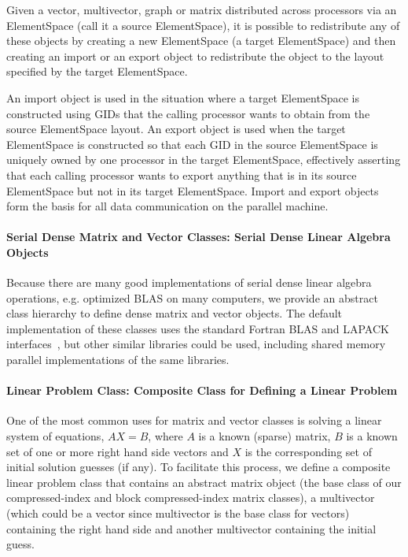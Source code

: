 \documentclass[10pt,relax]{PetraObjectModel}
\begin{document}
Given a vector, multivector, graph or matrix distributed across processors
via an ElementSpace (call it a source ElementSpace), it is possible to
redistribute any of these
objects by creating a new ElementSpace (a target ElementSpace) and then
creating an import or
an export object to redistribute the object to the layout specified by the
target ElementSpace.

An import object is used in the situation where a target ElementSpace is
 constructed
using GIDs that the calling processor wants to obtain from the source
 ElementSpace
layout.  An export object is used when the target ElementSpace is constructed
so that each GID in the source ElementSpace is uniquely owned by one processor
 in the target ElementSpace, effectively asserting that each calling processor
 wants to export anything
that is in its source ElementSpace but not in its target ElementSpace.
  Import and export
objects form the basis for all data communication on the parallel machine.

\paragraph{Serial Dense Matrix and Vector Classes:  Serial Dense Linear Algebra Objects}

Because there are many good implementations of serial dense linear algebra
operations, e.g. optimized BLAS on many computers, we provide an abstract
class hierarchy to define dense matrix and vector objects.  The default
implementation of these classes uses the standard Fortran BLAS and LAPACK
interfaces~\cite{BLAS1,BLAS2,BLAS3,LAPACK}, but other similar libraries could
be used, including shared memory parallel implementations of the same
libraries.

\paragraph{Linear Problem Class:  Composite Class for Defining a Linear Problem}

One of the most common uses for matrix and vector classes is solving a linear
system of equations, $AX = B$, where $A$ is a known (sparse) matrix, $B$ is a
known set of one or more right hand side vectors and $X$ is the corresponding
set of initial solution guesses (if any).  To facilitate this process, we
define a composite linear problem class that contains an abstract matrix object
(the base class of our compressed-index and block compressed-index matrix
classes), a multivector (which could be a vector since multivector is the base
class for vectors) containing the right hand side and another multivector
containing the initial guess.
\end{document}
